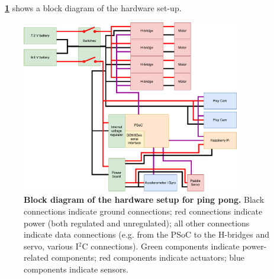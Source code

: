\documentclass[letterpaper, 11pt]{article}
\newcommand*{\figref}[1]{\textbf{\figurename~\ref{#1}}}
\newcommand{\iic}{I$^2$C\xspace}
\begin{document}
\begin{enumerate}[label=\textbf{\arabic*.}]
\figref{fig:blockdiagram} shows a block diagram of the hardware set-up.
\begin{figure}[ht]
    \centering
    \includegraphics[width=0.85\textwidth]{images/BlockDiagram.pdf}
    \caption{\textbf{Block diagram of the hardware setup for ping pong.} Black connections indicate ground connections; red connections indicate power (both regulated and unregulated); all other connections indicate data connections (e.g. from the PSoC to the H-bridges and servo, various \iic connections). Green components indicate power-related components; red components indicate actuators; blue components indicate sensors.}
    \label{fig:blockdiagram}
\end{figure}


\end{enumerate}
\end{document}
